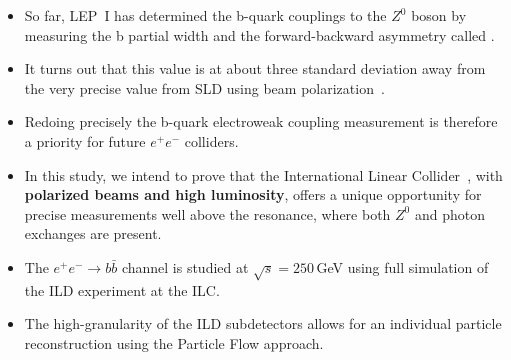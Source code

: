 

\begin{itemize}
	\item So far, LEP~I has determined the b-quark couplings to the $Z^0$ boson by measuring the b partial width and the forward-backward asymmetry called \afb.
	\item It turns out that this value is at about three standard deviation away from the very precise value from SLD using beam polarization~\cite{bib:AfbSMFit}.
	\item Redoing precisely the b-quark electroweak coupling measurement is therefore a priority for future $e^+e^-$ colliders. 
	
\end{itemize}

\begin{itemize}
	
	\item In this study, we intend to prove that the International Linear Collider~\cite{bib:ILC}, with \textbf{polarized beams and high luminosity}, offers a unique opportunity for precise measurements well above the resonance, where both $Z^0$ and photon exchanges are present. 
	\item {\color{Blue} The $e^+ e^-\to b\bar{b}$ channel is studied at $\sqrt{s}=250$\,GeV using full simulation of the ILD experiment at the ILC.}
	\item The high-granularity of the ILD subdetectors allows for an individual particle reconstruction using the Particle Flow approach.
\end{itemize}


